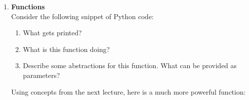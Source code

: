 \documentclass{article}
\newcounter{points}
\newcommand\printpoints{Total number of points: \thepoints}
\begin{document}
\begin{enumerate}
\begin{enumerate}
\item 
\end{enumerate}



\item \textbf{Functions} \\
Consider the following snippet of Python code: \\



\begin{enumerate}
\item What gets printed?
\end{enumerate}

\begin{enumerate}
\setcounter{enumii}{1}
\item What is this function doing?
\end{enumerate}

\begin{enumerate}
\setcounter{enumii}{2}
\item Describe some abstractions for this function.  What can be provided as parameters?
\end{enumerate}

Using concepts from the next lecture, here is a much more powerful function:

\begin{center}
\begin{tabular}{c}

\end{tabular}
\end{center}



\end{enumerate}
\end{document}

